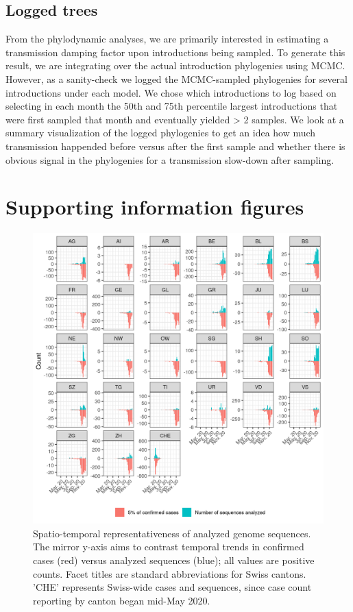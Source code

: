 \documentclass[9pt,twoside,lineno]{pnas-new}
\begin{document}
\subsection{Logged trees}
From the phylodynamic analyses, we are primarily interested in estimating a transmission damping factor upon introductions being sampled. To generate this result, we are integrating over the actual introduction phylogenies using MCMC. However, as a sanity-check we logged the MCMC-sampled phylogenies for several introductions under each model. We chose which introductions to log based on selecting in each month the 50th and 75th percentile largest introductions that were first sampled that month and eventually yielded > 2 samples. We look at a summary visualization of the logged phylogenies to get an idea how much transmission happended before versus after the first sample and whether there is obvious signal in the phylogenies for a transmission slow-down after sampling.

\newpage
\section{Supporting information figures}

\begin{figure}[H]
\centering
\includegraphics[width = 11.4cm]{figures/CHE_downsampling.png}
\caption{Spatio-temporal representativeness of analyzed genome sequences. The mirror y-axis aims to contrast temporal trends in confirmed cases (red) versus analyzed sequences (blue); all values are positive counts. Facet titles are standard abbreviations for Swiss cantons. 'CHE' represents Swiss-wide cases and sequences, since case count reporting by canton began mid-May 2020.}  
\label{fig:downsampling_representativeness}
\end{figure}
\end{document}
